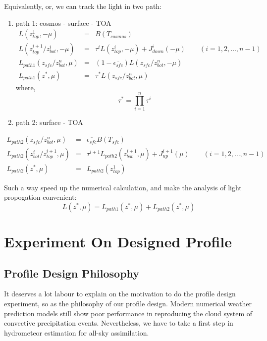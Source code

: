 \documentclass[a4paper]{report}
\begin{document}
Equivalently, or, we can track the light in two path:

\begin{enumerate} 
    \item path 1: cosmos - surface - TOA
    \begin{eqnarray} \label{eq:path1rad}
        L(z_{top}^{1}, -\mu) & = & B(T_{cosmos}) \nonumber\\
        L(z_{top}^{i+1}/z_{bot}^{i}, -\mu) & = & \tau^{i}L(z_{top}^{i}, -\mu) + J_{down}^{i}(-\mu) 
        \qquad (i=1,2, \ldots, n-1) \nonumber\\
        L_{path1}(z_{sfc}/z_{bot}^{n}, \mu) & = & (1-\overline{\epsilon_{sfc}})L(z_{sfc}/z_{bot}^{n}, -\mu) \nonumber\\
        L_{path1}(z^{*}, \mu) & = & \tau^{*}L(z_{sfc}/z_{bot}^{n}, \mu)
    \end{eqnarray} 
    where,
    \begin{equation} \label{eq:tau*}
        \tau^{*} = \prod_{i=1}^{n}\tau^{i}
    \end{equation}
    \item path 2: surface - TOA
\end{enumerate}
    \begin{eqnarray} \label{eq:path2rad}
        L_{path2}(z_{sfc}/z_{bot}^{n}, \mu) & = & \overline{\epsilon_{sfc}}B(T_{sfc}) \nonumber\\
        L_{path2}(z_{bot}^{i}/z_{top}^{i+1}, \mu) & = & \tau^{i+1}L_{path2}(z_{bot}^{i+1}, \mu) + J_{up}^{i+1}(\mu) 
        \qquad (i=1,2, \ldots, n-1) \nonumber\\
        L_{path2}(z^{*}, \mu) & = & L_{path2}(z_{top}^{1})
    \end{eqnarray}

Such a way speed up the numerical calculation, and make the analysis of light propogation convenient:
\begin{equation} \label{eq:path1 and path2}
    L(z^{*}, \mu) = L_{path1}(z^{*}, \mu) + L_{path2}(z^{*}, \mu)
\end{equation}

\chapter{Experiment On Designed Profile}

\section{Profile Design Philosophy}
It deserves a lot labour to explain on the motivation to do the profile design experiment,
so as the philosophy of our profile design. Modern numerical weather prediction models still show
poor performance in reproducing the cloud system of convective precipitation events. 
Nevertheless, we have to take a first step in hydrometeor estimation for all-sky assimilation.
\end{document}

